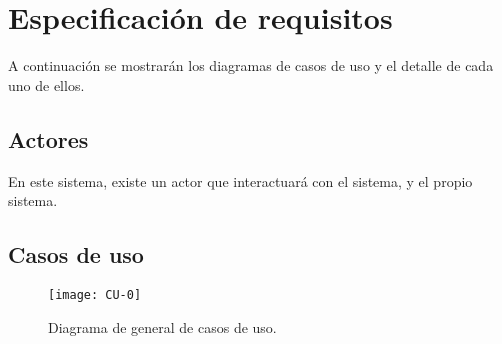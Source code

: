 \section{Especificación de requisitos}

A continuación se mostrarán los diagramas de casos de uso y el detalle de cada uno de ellos.


\subsection{Actores}

En este sistema, existe un actor que interactuará con el sistema, y el propio sistema.


\subsection{Casos de uso}
\begin{figure}[H]
	\centering
	\texttt{[image: CU-0]}
	\caption{Diagrama de general de casos de uso.}
	\label{fig:CU-0}
\end{figure}


